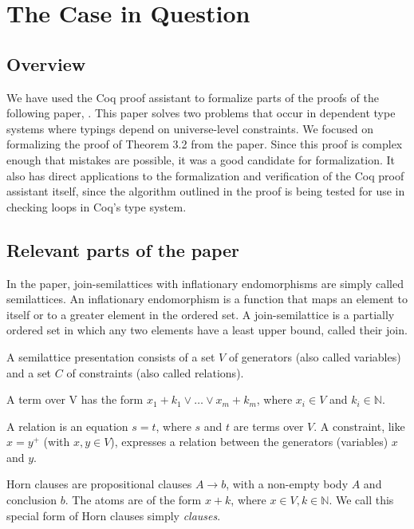 \chapter{The Case in Question}
\label{chap:case}

\section{Overview}

We have used the Coq proof assistant to formalize parts of the proofs of the following paper, \citeauthor{mbezem} \cite{mbezem}.
This paper solves two problems that occur in dependent type systems where typings depend
on universe-level constraints. We focused on formalizing the proof of Theorem 3.2 from the paper.
Since this proof is complex enough that mistakes are possible, it was a good candidate for formalization.
It also has direct applications to the formalization and verification of the Coq proof assistant itself,
since the algorithm outlined in the proof is being tested
for use in checking loops in Coq's type system. \cite{coqgithub}

\section{Relevant parts of the paper}

In the paper, join-semilattices with inflationary endomorphisms
are simply called semilattices. An inflationary endomorphism is a function
that maps an element to itself or to a greater element in the ordered set.
A join-semilattice is a partially ordered set in which any two elements have a least upper bound,
called their join.

A semilattice presentation consists of a set $V$ of generators
(also called variables) and a set $C$ of constraints
(also called relations).

A term over V has the form $x_1 + k_1 \lor \ldots \lor x_m + k_m$, where $x_i \in V$ and $k_i \in \mathbb{N}$.

A relation is an equation $s = t$, where $s$ and $t$ are terms over $V$.
A constraint, like $x = y^+$ (with $x, y \in V$), expresses a relation between the generators (variables) $x$ and $y$.

Horn clauses are propositional clauses $A \rightarrow b$, with a non-empty body $A$ and conclusion $b$.
The atoms are of the form $x + k$, where $x \in V, k \in \mathbb{N}$.
We call this special form of Horn clauses simply \textit{clauses}.

